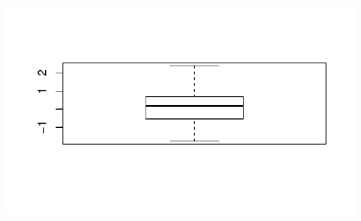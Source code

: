 \documentclass[12pt,a4paper]{article}\usepackage[]{graphicx}\usepackage[]{color}
\makeatletter
\def\maxwidth{ %
  \ifdim\Gin@nat@width>\linewidth
    \linewidth
  \else
    \Gin@nat@width
  \fi
}
\newenvironment{knitrout}{}{} %
\makeatother
\begin{document}
\begin{itemize}
\begin{knitrout}
{\centering \includegraphics[width=\maxwidth]{figure/unnamed-chunk-7-1} 

}



\end{knitrout}

\end{itemize}
\end{document}
